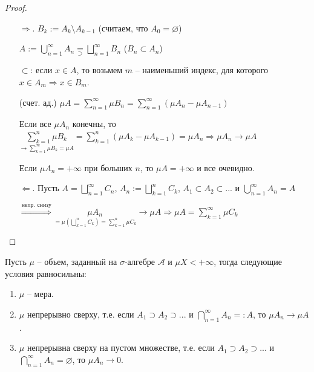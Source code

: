 \begin{proof}~
    \begin{enumerate}
        \item[$\Rightarrow$.] $B_k := A_k \setminus A_{k-1}$ (считаем, что $A_0=\varnothing$)
        
        $A:=\bigcup\limits_{n=1}^\infty A_n \underset{\supset}{=} \bigsqcup\limits_{n=1}^\infty B_n$ ($B_n \subset A_n$)

        $\subset$: если $x\in A$, то возьмем $m$ – наименьший индекс, для которого $x\in A_m\Rightarrow x\in B_m$.

        (счет. ад.) $\mu A= \sum \limits_{n=1}^\infty \mu B_n = \sum \limits_{n=1}^\infty(\mu A_n - \mu A_{n-1})$

        Если все $\mu A_n$ конечны, то $\underset{\rightarrow \sum \limits_{k=1}^\infty \mu B_k=\mu A}{\sum \limits_{k=1}^n \mu B_k} = \sum \limits_{k=1}^n (\mu A_k - \mu A_{k-1})=\mu A_n\Rightarrow \mu A_n\rightarrow \mu A$

        Если $\mu A_n=+\infty$ при больших $n$, то $\mu A=+\infty$ и все очевидно.

        \item[$\Leftarrow$.] Пусть $A=\bigsqcup \limits_{n=1}^\infty C_n$, $A_n:=\bigsqcup \limits_{k=1}^n C_k$, $A_1\subset A_2 \subset ...$ и $\bigcup\limits_{n=1}^\infty A_n = A$
        
        $\overset{\text{непр. снизу}}{\Rightarrow}\underset{=\mu (\bigsqcup\limits_{k=1}^n C_k)=\sum\limits_{k=1}^n\mu C_k}{\mu A_n}\rightarrow \mu A
        \Rightarrow \mu A = \sum\limits_{k=1}^\infty \mu C_k$
    \end{enumerate}
\end{proof}

\begin{theorem}
    Пусть $\mu$ –  объем, заданный на $\sigma$-алгебре $\mathcal{A}$ и $\mu X< +\infty$, 
    тогда следующие условия равносильны:
    \begin{enumerate}
        \item $\mu$ – мера.
        \item $\mu$ непрерывно сверху, т.е. если $A_1 \supset A_2 \supset ...$ и $\bigcap\limits_{n=1}^\infty A_n = :A$, 
        то $\mu A_n \rightarrow \mu A$.
        \item $\mu$ непрерывна сверху на пустом множестве, т.е. если $A_1 \supset A_2 \supset ...$ и $\bigcap\limits_{n=1}^\infty A_n = \varnothing$, то $\mu A_n \rightarrow 0$.
    \end{enumerate}
\end{theorem}

